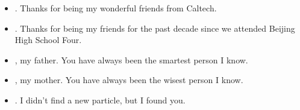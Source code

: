 \begin{itemize}
	\item {}. Thanks for being my wonderful friends from Caltech.
	\item {}. Thanks for being my friends for the past decade since we attended Beijing High School Four.
	\item {}, my father. You have always been the smartest person I know.
	\item {}, my mother. You have always been the wisest person I know.
	\item {}. I didn't find a new particle, but I found you.
\end{itemize}


